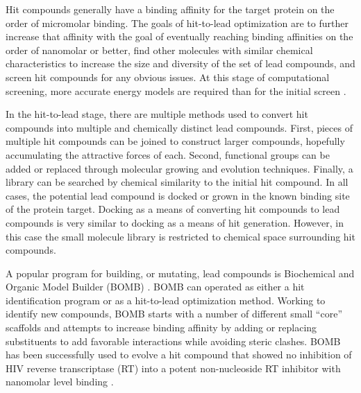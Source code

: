 Hit compounds generally have a binding affinity for the target protein on the order of micromolar binding.
The goals of hit-to-lead optimization are to further increase that affinity with the goal of eventually reaching binding affinities on the order of  nanomolar or better, find other molecules with similar chemical characteristics to increase the size and diversity of the set of lead compounds, and screen hit compounds for any obvious issues.
At this stage of computational screening, more accurate energy models are required than for the initial screen \cite{jorgensen2004many,gohlke2002approaches,jorgensen2009efficient}.

In the hit-to-lead stage, there are multiple methods used to convert hit compounds into multiple and chemically distinct lead compounds.
First, pieces of multiple hit compounds can be joined to construct larger compounds, hopefully accumulating the attractive forces of each.
Second, functional groups can be added or replaced through molecular growing and evolution techniques.
Finally, a library can be searched by chemical similarity to the initial hit compound.
In all cases, the potential lead compound is docked or grown in the known binding site of the protein target.
Docking as a means of converting hit compounds to lead compounds is very similar to docking as a means of hit generation.
However, in this case the small molecule library is restricted to chemical space surrounding hit compounds.

A popular program for building, or mutating, lead compounds is Biochemical and Organic Model Builder (BOMB) \cite{barreiro2007docking}.
BOMB can operated as either a hit identification program or as a hit-to-lead optimization method.
Working to identify new compounds, BOMB starts with a number of different small ``core'' scaffolds and attempts to increase binding affinity by adding or replacing substituents to add favorable interactions while avoiding steric clashes.
BOMB has been successfully used to evolve a hit compound that showed no inhibition of HIV reverse transcriptase (RT) into a potent non-nucleoside RT inhibitor with nanomolar level binding \cite{barreiro2007docking}.

